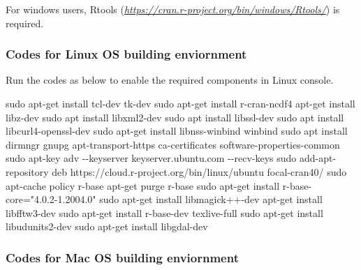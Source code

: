 \documentclass[
]{article}
\newenvironment{Shaded}{\begin{snugshade}}{\end{snugshade}}
\newcommand{\ExtensionTok}[1]{#1}
\newcommand{\FunctionTok}[1]{\textcolor[rgb]{0.00,0.00,0.00}{#1}}
\newcommand{\NormalTok}[1]{#1}
\newcommand{\StringTok}[1]{\textcolor[rgb]{0.31,0.60,0.02}{#1}}
\begin{document}
For windows users, Rtools
(\emph{\url{https://cran.r-project.org/bin/windows/Rtools/}}) is
required.

\hypertarget{codes-for-linux-os-building-enviornment}{%
\subsubsection{Codes for Linux OS building
enviornment}\label{codes-for-linux-os-building-enviornment}}

Run the codes as below to enable the required components in Linux
console.

\begin{Shaded}
\begin{Highlighting}[]
\FunctionTok{sudo}\NormalTok{ apt{-}get install tcl{-}dev tk{-}dev}
\FunctionTok{sudo}\NormalTok{ apt{-}get install r{-}cran{-}ncdf4}
\ExtensionTok{apt{-}get}\NormalTok{ install libz{-}dev}
\FunctionTok{sudo}\NormalTok{ apt install libxml2{-}dev}
\FunctionTok{sudo}\NormalTok{ apt install libssl{-}dev}
\FunctionTok{sudo}\NormalTok{ apt install libcurl4{-}openssl{-}dev}
\FunctionTok{sudo}\NormalTok{ apt{-}get install libnss{-}winbind winbind}
\FunctionTok{sudo}\NormalTok{ apt install dirmngr gnupg apt{-}transport{-}https ca{-}certificates software{-}properties{-}common}
\FunctionTok{sudo}\NormalTok{ apt{-}key adv {-}{-}keyserver keyserver.ubuntu.com {-}{-}recv{-}keys}
\FunctionTok{sudo}\NormalTok{ add{-}apt{-}repository }\StringTok{\textquotesingle{}deb https://cloud.r{-}project.org/bin/linux/ubuntu focal{-}cran40/\textquotesingle{}}
\FunctionTok{sudo}\NormalTok{ apt{-}cache policy r{-}base}
\ExtensionTok{apt{-}get}\NormalTok{ purge r{-}base}
\FunctionTok{sudo}\NormalTok{ apt{-}get install r{-}base{-}core=}\StringTok{"4.0.2{-}1.2004.0"}
\FunctionTok{sudo}\NormalTok{ apt{-}get install libmagick++{-}dev}
\ExtensionTok{apt{-}get}\NormalTok{ install libfftw3{-}dev}
\FunctionTok{sudo}\NormalTok{ apt{-}get install r{-}base{-}dev texlive{-}full}
\FunctionTok{sudo}\NormalTok{ apt{-}get install libudunits2{-}dev}
\FunctionTok{sudo}\NormalTok{ apt{-}get install libgdal{-}dev}
\end{Highlighting}
\end{Shaded}

\hypertarget{codes-for-mac-os-building-enviornment}{%
\subsubsection{Codes for Mac OS building
enviornment}\label{codes-for-mac-os-building-enviornment}}
\end{document}
